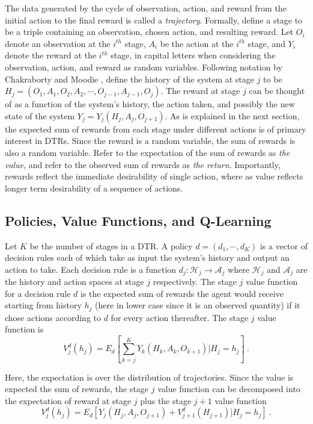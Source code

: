 The data generated by the cycle of observation, action, and reward from the initial action to the final reward is called a \textit{trajectory}. Formally,  define a stage to be a triple containing an observation, chosen action, and resulting reward. Let $O_i$ denote an observation at the $i^{th}$ stage, $ A_i $ be the action at the $ i^{th} $ stage, and $ Y_i $ denote the reward at the $ i^{th}$ stage,  in capital letters when considering the observation, action, and reward as random variables. Following notation by Chakraborty and Moodie \cite{chakraborty2013statistical},  define the history of the system at stage $j$ to be $ H_j = (O_1, A_1, O_2, A_2, \cdots , O_{j-1}, A_{j-1}, O_j) $.  The reward at stage $j$ can be thought of as a function of the system’s history, the action taken, and possibly the new state of the system $ Y_j = Y_j(H_j, A_j, O_{j+1}) $.  As is explained in the next section, the expected sum of rewards from each stage under different actions is of primary interest in DTRs.  Since the reward is a random variable, the sum of rewards is also a random variable.  Refer to the expectation of the sum of rewards as \textit{the value}, and  refer to the observed sum of rewards as \textit{the return}. Importantly, rewards reflect the immediate desirability of single action, where as value reflects longer term desirability of a sequence of actions.

\subsection{Policies, Value Functions, and Q-Learning}

Let $K$ be the number of stages in a DTR.  A policy $ d = (d_1, \cdots, d_K) $ is a vector of decision rules each of which take as input the system’s history and output an action to take.  Each decision rule is a function $d_j : \mathcal{H}_j \to \mathcal{A}_j$ where $\mathcal{H}_j$ and $\mathcal{A}_j$ are the history and action spaces at stage $j$ respectively.  The stage $ j $ value function for a decision rule $ d $ is the expected sum of rewards the agent would receive starting from history $ h_j  $ (here in lower case since it is an observed quantity) if it chose actions according to $ d $ for every action thereafter.  The stage $j$ value function is 
\begin{equation}
	V^d_j(h_j) = E_d\left[ \sum_{k=j}^K Y_k(H_k, A_k, O_{k+1}) \Bigg\lvert H_j = h_j\right] \>.
\end{equation}

\noindent Here, the expectation is over the distribution of trajectories. Since the value is expected the sum of rewards, the stage $ j $ 
value function can be decomposed into the expectation of reward at stage $ j $ plus the stage $ j+1  $ value function  \cite{chakraborty2013statistical}
\begin{equation}
	V^d_j(h_j) = E_d\left[Y_j(H_j, A_j, O_{j+1}) + V^d_{j+1}(H_{j+1}) \vert H_j = h_j\right] \>.
\end{equation}



